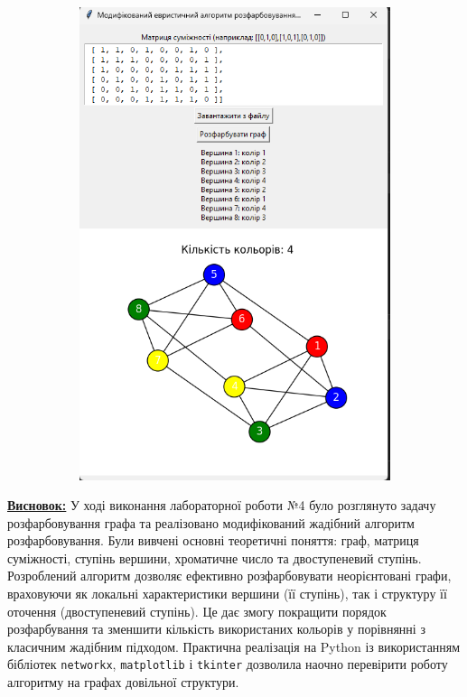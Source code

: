 \documentclass[12pt,a4paper]{article}
\begin{document}
\begin{figure}[htbp]
\begin{subfigure}{0.35\textwidth}
            \includegraphics[width=\linewidth]{ex3.png}
            \label{fig:d}
        \end{subfigure}

        \label{fig:grid4}
    \end{figure}

    \textbf{\underline{Висновок:}}
    У ході виконання лабораторної роботи №4 було розглянуто задачу розфарбовування графа та реалізовано модифікований жадібний алгоритм розфарбовування. Були вивчені основні теоретичні поняття: граф, матриця суміжності, ступінь вершини, хроматичне число та двоступеневий ступінь.
    Розроблений алгоритм дозволяє ефективно розфарбовувати неорієнтовані графи, враховуючи як локальні характеристики вершини (її ступінь), так і структуру її оточення (двоступеневий ступінь). Це дає змогу покращити порядок розфарбування та зменшити кількість використаних кольорів у порівнянні з класичним жадібним підходом.
    Практична реалізація на Python із використанням бібліотек \texttt{networkx}, \texttt{matplotlib} і \texttt{tkinter} дозволила наочно перевірити роботу алгоритму на графах довільної структури.
\end{document}
